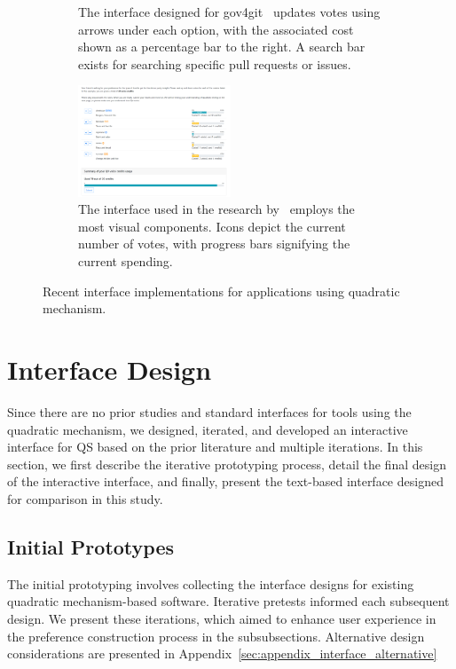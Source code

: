 {\begin{figure}[p]
\begin{subfigure}[b]{0.47\textwidth}
        \caption{The interface designed for gov4git~\cite{Gov4gitDecentralizedPlatform2023} updates votes using arrows under each option, with the associated cost shown as a percentage bar to the right. A search bar exists for searching specific pull requests or issues.}
        \label{fig:gov4gitInterface}
    \end{subfigure}
    
    \vspace{0.2cm}
    
    \begin{subfigure}[b]{0.7\textwidth}
        \centering
        \includegraphics[width=0.50\textwidth]{content/image/curr_interface/cheng_qv.png}
        \caption{The interface used in the research by~\textcite{chengCanShowWhat2021} employs the most visual components. Icons depict the current number of votes, with progress bars signifying the current spending.}
        \label{fig:chengInterface}
    \end{subfigure}
    
    \caption{Recent interface implementations for applications using quadratic mechanism.}
    \label{fig:qv_interface_external}
\end{figure}
\clearpage
}

\section{Interface Design}
\label{sec:interfaceDesign}
Since there are no prior studies and standard interfaces for tools using the quadratic mechanism, we designed, iterated, and developed an interactive interface for QS based on the prior literature and multiple iterations.  In this section, we first describe the iterative prototyping process, detail the final design of the interactive interface, and finally, present the text-based interface designed for comparison in this study.

\subsection{Initial Prototypes}
The initial prototyping involves collecting the interface designs for existing quadratic mechanism-based software. Iterative pretests informed each subsequent design. We present these iterations, which aimed to enhance user experience in the preference construction process in the subsubsections. Alternative design considerations are presented in Appendix~\ref{sec:appendix_interface_alternative}

